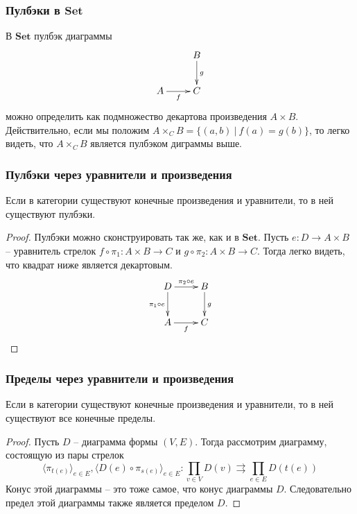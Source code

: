 \documentclass{beamer}
\theoremstyle{definition}
\newcommand{\cat}[1]{\mathbf{#1}}
\newcommand{\Set}{\cat{Set}}
\begin{document}
\begin{frame}
\frametitle{Пулбэки в $\Set$}
В $\Set$ пулбэк диаграммы
\[ \xymatrix{          & B \ar[d]^g \\
              A \ar[r]_f & C
            } \]
можно определить как подмножество декартова произведения $A \times B$.
Действительно, если мы положим $A \times_C B = \{ (a, b)\ |\ f(a) = g(b) \}$, то легко видеть, что $A \times_C B$ является пулбэком диграммы выше.
\end{frame}

\begin{frame}
\frametitle{Пулбэки через уравнители и произведения}
\begin{prop}
Если в категории существуют конечные произведения и уравнители, то в ней существуют пулбэки.
\end{prop}
\begin{proof}
Пулбэки можно сконструировать так же, как и в $\Set$.
Пусть $e : D \to A \times B$ -- уравнитель стрелок $f \circ \pi_1 : A \times B \to C$ и $g \circ \pi_2 : A \times B \to C$.
Тогда легко видеть, что квадрат ниже является декартовым.
\[ \xymatrix{ D \ar[d]_{\pi_1 \circ e} \ar[r]^{\pi_2 \circ e} & B \ar[d]^g \\
              A \ar[r]_f                                      & C
            } \]
\end{proof}
\end{frame}

\begin{frame}
\frametitle{Пределы через уравнители и произведения}
\begin{prop}
Если в категории существуют конечные произведения и уравнители, то в ней существуют все конечные пределы.
\end{prop}
\begin{proof}
Пусть $D$ -- диаграмма формы $(V,E)$. Тогда рассмотрим диаграмму, состоящую из пары стрелок
\[ \langle \pi_{t(e)} \rangle_{e \in E}, \langle D(e) \circ \pi_{s(e)} \rangle_{e \in E} : \prod_{v \in V} D(v) \rightrightarrows \prod_{e \in E} D(t(e)) \]
Конус этой диаграммы -- это тоже самое, что конус диаграммы $D$.
Следовательно предел этой диаграммы также является пределом $D$.
\end{proof}
\end{frame}
\end{document}
